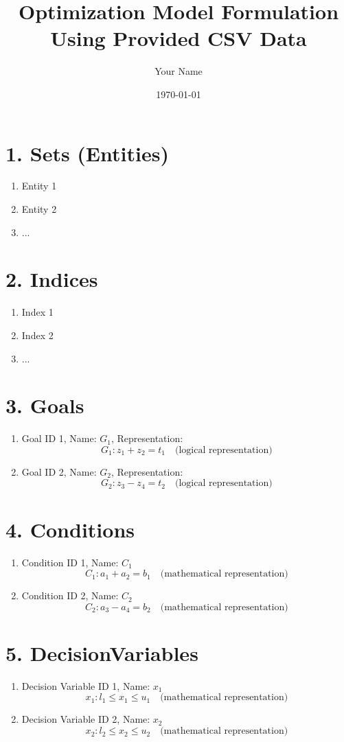 \documentclass{article}
\title{Optimization Model Formulation Using Provided CSV Data}
\author{Your Name}
\date{\today}
\begin{document}
\maketitle

\tableofcontents

\section{1. Sets (Entities)}
\begin{enumerate}
    \item Entity 1
    \item Entity 2
    \item ...
\end{enumerate}

\section{2. Indices}
\begin{enumerate}
    \item Index 1
    \item Index 2
    \item ...
\end{enumerate}

\section{3. Goals}
\begin{enumerate}
    \item Goal ID 1, Name: $G_1$, Representation:
        \[
        G_1: z_1 + z_2 = t_1 \quad \text{(logical representation)}
        \]
    \item Goal ID 2, Name: $G_2$, Representation:
        \[
        G_2: z_3 - z_4 = t_2 \quad \text{(logical representation)}
        \]
\end{enumerate}

\section{4. Conditions}
\begin{enumerate}
    \item Condition ID 1, Name: $C_1$
        \[
        C_1: a_1 + a_2 = b_1 \quad \text{(mathematical representation)}
        \]
    \item Condition ID 2, Name: $C_2$
        \[
        C_2: a_3 - a_4 = b_2 \quad \text{(mathematical representation)}
        \]
\end{enumerate}

\section{5. DecisionVariables}
\begin{enumerate}
    \item Decision Variable ID 1, Name: $x_1$
        \[
        x_1: l_1 \leq x_1 \leq u_1 \quad \text{(mathematical representation)}
        \]
    \item Decision Variable ID 2, Name: $x_2$
        \[
        x_2: l_2 \leq x_2 \leq u_2 \quad \text{(mathematical representation)}
        \]
\end{enumerate}
\end{document}
